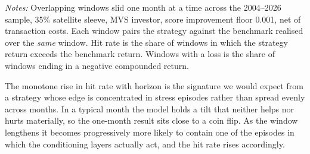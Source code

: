 \documentclass[11pt, a4paper]{article}
\begin{document}
\begin{table}[t]
\centering
\caption{Distribution of Outcomes by Holding Period (35\% Sleeve, MVS Investor)}
\label{tab:rolling_horizon}
\setlength{\tabcolsep}{5pt}
\footnotesize
{}
\begin{minipage}{\linewidth}
\vspace{4pt}\footnotesize
\textit{Notes:} Overlapping windows slid one month at a time across the 2004--2026 sample,
35\% satellite sleeve, MVS investor, score improvement floor 0.001, net of transaction costs.
Each window pairs the strategy against the benchmark realised over the \emph{same} window.
Hit rate is the share of windows in which the strategy return exceeds the benchmark return.
Windows with a loss is the share of windows ending in a negative compounded return.
\end{minipage}
\end{table}



The monotone rise in hit rate with horizon is the signature we would expect from a strategy
whose edge is concentrated in stress episodes rather than spread evenly across months. In a
typical month the model holds a tilt that neither helps nor hurts materially, so the one-month
result sits close to a coin flip. As the window lengthens it becomes progressively more likely
to contain one of the episodes in which the conditioning layers actually act, and the hit rate
rises accordingly.
\end{document}
